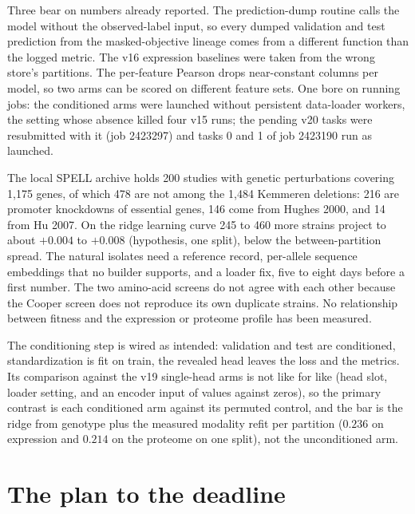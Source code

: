  Three bear on numbers already reported. The prediction-dump routine
calls the model without the observed-label input, so every dumped validation and test
prediction from the masked-objective lineage comes from a different function than the logged
metric. The v16 expression baselines were taken from the wrong store's partitions. The
per-feature Pearson drops near-constant columns per model, so two arms can be scored on
different feature sets. One bore on running jobs: the conditioned arms were launched without
persistent data-loader workers, the setting whose absence killed four v15 runs; the pending
v20 tasks were resubmitted with it (job 2423297) and tasks 0 and 1 of job 2423190 run as
launched.

 The local SPELL archive holds
200 studies with genetic perturbations covering 1{,}175 genes, of which 478 are not among
the 1{,}484 Kemmeren deletions: 216 are promoter knockdowns of essential genes, 146 come
from Hughes 2000, and 14 from Hu 2007. On the ridge learning curve 245 to 460 more strains
project to about $+0.004$ to $+0.008$ (hypothesis, one split), below the between-partition
spread. The natural isolates need a reference record, per-allele sequence embeddings that no
builder supports, and a loader fix, five to eight days before a first number. The two
amino-acid screens do not agree with each other because the Cooper screen does not
reproduce its own duplicate strains. No relationship between fitness and the expression or
proteome profile has been measured.

 The conditioning step is wired as intended: validation and
test are conditioned, standardization is fit on train, the revealed head leaves the loss
and the metrics. Its comparison against the v19 single-head arms is not like for like (head
slot, loader setting, and an encoder input of values against zeros), so the primary
contrast is each conditioned arm against its permuted control, and the bar is the ridge
from genotype plus the measured modality refit per partition ($0.236$ on expression and
$0.214$ on the proteome on one split), not the unconditioned arm.

\section{The plan to the deadline}
\label{sec:plan}

